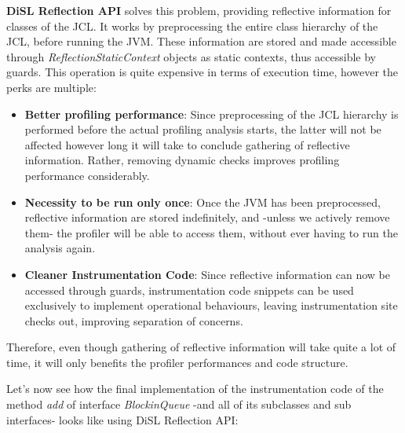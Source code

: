 \documentclass[]{usiinfthesis}
\begin{document}
\noindent
\textbf{DiSL Reflection API} solves this problem, providing reflective information for classes of the JCL. It works by preprocessing the entire class hierarchy of the JCL, before running the JVM. These information are stored and made accessible through \textit{ReflectionStaticContext} objects as static contexts, thus accessible by guards. This operation is quite expensive in terms of execution time, however the perks are multiple:
\begin{itemize}
    \item \textbf{Better profiling performance}: Since preprocessing of the JCL hierarchy is performed before the actual profiling analysis starts, the latter will not be affected however long it will take to conclude gathering of reflective information. Rather, removing dynamic checks improves profiling performance considerably. 
    \item \textbf{Necessity to be run only once}: Once the JVM has been preprocessed, reflective information are stored indefinitely, and -unless we actively remove them- the profiler will be able to access them, without ever having to run the analysis again. 
    \item \textbf{Cleaner Instrumentation Code}: Since reflective information can now be accessed through guards, instrumentation code snippets can be used exclusively to implement operational behaviours, leaving instrumentation site checks out, improving separation of concerns. 
\end{itemize}

Therefore, even though gathering of reflective information will take quite a lot of time, it will only benefits the profiler performances and code structure. 

\vspace*{0.5cm}
\noindent
Let's now see how the final implementation of the instrumentation code of the method \textit{add} of interface \textit{BlockinQueue} -and all of its subclasses and sub interfaces- looks like using DiSL Reflection API:
\end{document}
